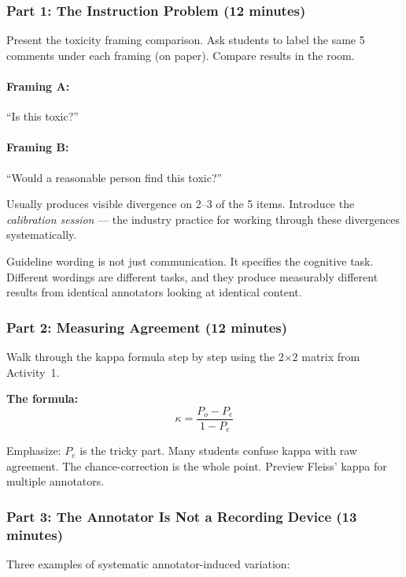 \subsubsection{Part 1: The Instruction Problem (12 minutes)}

Present the toxicity framing comparison. Ask students to label the same 5 comments under each framing (on paper). Compare results in the room.

\paragraph{Framing A:} ``Is this toxic?''\\
\paragraph{Framing B:} ``Would a reasonable person find this toxic?''

Usually produces visible divergence on 2--3 of the 5 items. Introduce the \emph{calibration session} --- the industry practice for working through these divergences systematically.

\begin{keyconcept}
Guideline wording is not just communication. It specifies the cognitive task. Different wordings are different tasks, and they produce measurably different results from identical annotators looking at identical content.
\end{keyconcept}

\subsubsection{Part 2: Measuring Agreement (12 minutes)}

Walk through the kappa formula step by step using the 2$\times$2 matrix from Activity~1.

\textbf{The formula:}
\[
\kappa = \frac{P_o - P_e}{1 - P_e}
\]

Emphasize: $P_e$ is the tricky part. Many students confuse kappa with raw agreement. The chance-correction is the whole point. Preview Fleiss' kappa for multiple annotators.

\subsubsection{Part 3: The Annotator Is Not a Recording Device (13 minutes)}

Three examples of systematic annotator-induced variation:

